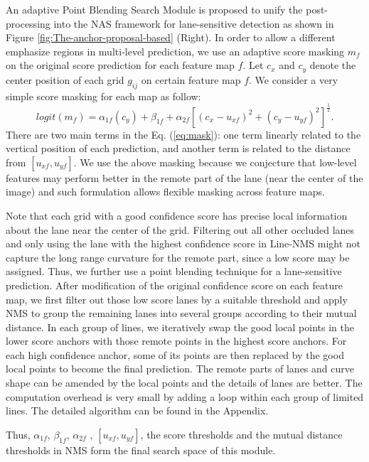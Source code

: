 \documentclass[runningheads]{llncs}
\begin{document}
An adaptive Point Blending Search Module is proposed to unify the
post-processing into the NAS framework for lane-sensitive detection
as shown in Figure \ref{fig:The-anchor-proposal-based} (Right). In
order to allow a different emphasize regions in multi-level prediction,
we use an adaptive score masking $m_{f}$ on the original score prediction
for each feature map $f$. Let $c_{x}$ and $c_{y}$ denote the center
position of each grid $g_{ij}$ on certain feature map $f$. We consider
a very simple score masking for each map as follow:
\begin{equation}
logit(m_{f})=\alpha_{1f}(c_{y})+\beta_{1f}+\alpha_{2f}\left[(c_{x}-u_{xf})^{2}+(c_{y}-u_{yf})^{2}\right]^{\frac{1}{2}}.\label{eq:mask}
\end{equation}
There are two main terms in the Eq. (\ref{eq:mask}): one term linearly
related to the vertical position of each prediction, and another term
is related to the distance from $[u_{xf},u_{yf}]$. We use the above
masking because we conjecture that low-level features may perform
better in the remote part of the lane (near the center of the image)
and such formulation allows flexible masking across feature maps. 

Note that each grid with a good confidence score has precise local
information about the lane near the center of the grid. Filtering
out all other occluded lanes and only using the lane with the highest
confidence score in Line-NMS might not capture the long range curvature
for the remote part, since a low score may be assigned. Thus, we further
use a point blending technique for a lane-sensitive prediction. After
modification of the original confidence score on each feature map,
we first filter out those low score lanes by a suitable threshold
and apply NMS to group the remaining lanes into several groups according
to their mutual distance. In each group of lines, we iteratively swap
the good local points in the lower score anchors with those remote
points in the highest score anchors. For each high confidence anchor,
some of its points are then replaced by the good local points to become
the final prediction. The remote parts of lanes and curve shape can
be amended by the local points and the details of lanes are better.
The computation overhead is very small by adding a loop within each
group of limited lines. The detailed algorithm can be found in the
Appendix.

Thus, $\alpha_{1f}$, $\beta_{1f}$, $\alpha_{2f}$ , $[u_{xf},u_{yf}]$,
the score thresholds and the mutual distance thresholds in NMS form
the final search space of this module. 
\end{document}
